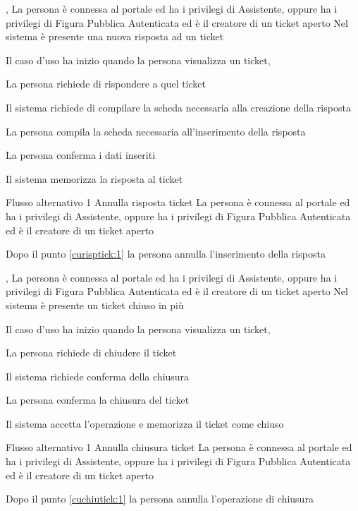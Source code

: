 \tabcuvspace

{, }
{La persona è connessa al portale ed ha i privilegi di Assistente, oppure ha i privilegi di Figura Pubblica Autenticata ed è il creatore di un ticket aperto}
{Nel sistema è presente una nuova risposta ad un ticket}
{\begin{enumCU}
	\item Il caso d'uso ha inizio quando la persona visualizza un ticket, 
	\item La persona richiede di rispondere a quel ticket
	\item Il sistema richiede di compilare la scheda necessaria alla creazione della risposta
	\item La persona compila la scheda necessaria all'inserimento della risposta\label{curisptick:1}
	\item La persona conferma i dati inseriti
	\item Il sistema memorizza la risposta al ticket
\end{enumCU}}
%
{Flusso alternativo 1}%
{Annulla risposta ticket}%
{La persona è connessa al portale ed ha i privilegi di Assistente, oppure ha i privilegi di Figura Pubblica Autenticata ed è il creatore di un ticket aperto}%
{\postNulle}%
{\begin{enumCU}
		\item Dopo il punto \ref{curisptick:1} la persona annulla l'inserimento della risposta
	\end{enumCU}}%

\tabcuvspace

{, }
{La persona è connessa al portale ed ha i privilegi di Assistente, oppure ha i privilegi di Figura Pubblica Autenticata ed è il creatore di un ticket aperto}
{Nel sistema è presente un ticket chiuso in più}
{\begin{enumCU}
	\item Il caso d'uso ha inizio quando la persona visualizza un ticket, \label{cuchiutick:0}
	\item La persona richiede di chiudere il ticket
	\item Il sistema richiede conferma della chiusura\label{cuchiutick:1}
	\item La persona conferma la chiusura del ticket
	\item Il sistema accetta l'operazione e memorizza il ticket come chiuso
\end{enumCU}}
%
{Flusso alternativo 1}%
{Annulla chiusura ticket}%
{La persona è connessa al portale ed ha i privilegi di Assistente, oppure ha i privilegi di Figura Pubblica Autenticata ed è il creatore di un ticket aperto}%
{\postNulle}%
{\begin{enumCU}
		\item Dopo il punto \ref{cuchiutick:1} la persona annulla l'operazione di chiusura
	\end{enumCU}}%

